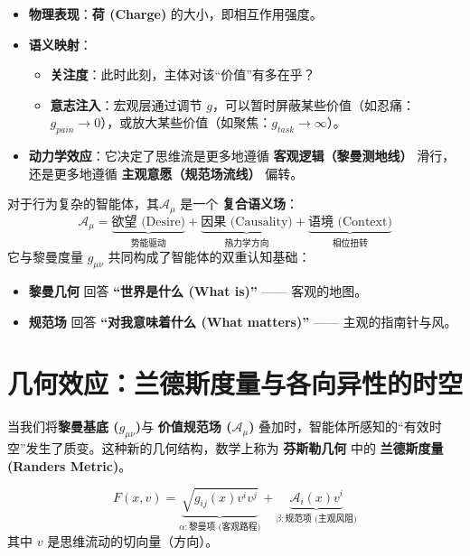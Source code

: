 \begin{itemize}
    \item \textbf{物理表现}：\textbf{荷 (Charge)} 的大小，即相互作用强度。
    \item \textbf{语义映射}：
    \begin{itemize}
        \item \textbf{关注度}：此时此刻，主体对该“价值”有多在乎？
        \item \textbf{意志注入}：宏观层通过调节 $g$，可以暂时屏蔽某些价值（如忍痛：$g_{pain} \to 0$），或放大某些价值（如聚焦：$g_{task} \to \infty$）。
    \end{itemize}
    \item \textbf{动力学效应}：它决定了思维流是更多地遵循 \textbf{客观逻辑（黎曼测地线）} 滑行，还是更多地遵循 \textbf{主观意愿（规范场流线）} 偏转。
\end{itemize}

\begin{theorem}[规范场的完备性定义]
    对于行为复杂的智能体，其$\mathcal{A}_\mu$ 是一个 \textbf{复合语义场}：
    $$ \mathcal{A}_\mu = \underbrace{\text{欲望 (Desire)}}_{\text{势能驱动}} + \underbrace{\text{因果 (Causality)}}_{\text{热力学方向}} + \underbrace{\text{语境 (Context)}}_{\text{相位扭转}} $$
    它与黎曼度量 $g_{\mu\nu}$ 共同构成了智能体的双重认知基础：
    \begin{itemize}
        \item \textbf{黎曼几何} 回答 \textbf{“世界是什么 (What is)”} —— 客观的地图。
        \item \textbf{规范场} 回答 \textbf{“对我意味着什么 (What matters)”} —— 主观的指南针与风。
    \end{itemize}
\end{theorem}


\section{几何效应：兰德斯度量与各向异性的时空}
\label{sec:section_5960}

当我们将\textbf{黎曼基底 ($g_{\mu\nu}$)}与 \textbf{价值规范场 ($\mathcal{A}_\mu$)} 叠加时，智能体所感知的“有效时空”发生了质变。这种新的几何结构，数学上称为 \textbf{芬斯勒几何} 中的 \textbf{兰德斯度量 (Randers Metric)}。


$$ F(x, v) = \underbrace{\sqrt{g_{ij}(x) v^i v^j}}_{\alpha: \text{黎曼项 (客观路程)}} + \underbrace{\mathcal{A}_i(x) v^i}_{\beta: \text{规范项 (主观风阻)}} $$
其中 $v$ 是思维流动的切向量（方向）。

